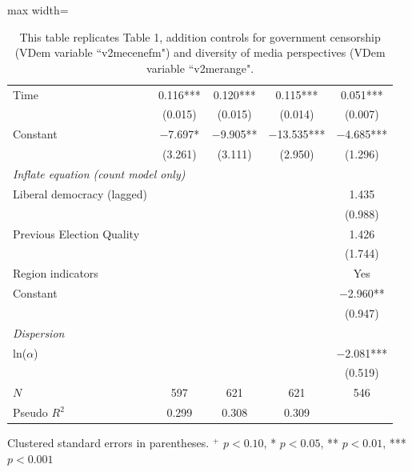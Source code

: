 \documentclass[USletter,12pt, titlepage]{article} %
\begin{document}
\begin{table}[H]
\begin{adjustbox}{max width=\textwidth}
\begin{threeparttable}
\begin{tabular}{lcccc}
Time & 0.116*** & 0.120*** & 0.115*** & 0.051*** \\
 & (0.015) & (0.015) & (0.014) & (0.007) \\
Constant & $-$7.697* & $-$9.905** & $-$13.535*** & $-$4.685*** \\
 & (3.261) & (3.111) & (2.950) & (1.296) \\
\midrule
\multicolumn{5}{l}{\textit{Inflate equation (count model only)}} \\
\midrule
Liberal democracy (lagged) & & & & 1.435 \\
 & & & & (0.988) \\
Previous Election Quality & & & & 1.426 \\
 & & & & (1.744) \\
Region indicators & & & & Yes \\
Constant & & & & $-$2.960** \\
 & & & & (0.947) \\
\midrule
\multicolumn{5}{l}{\textit{Dispersion}} \\
\midrule
ln($\alpha$) & & & & $-$2.081*** \\
 & & & & (0.519) \\
\midrule
$N$ & 597 & 621 & 621 & 546 \\
Pseudo $R^{2}$ & 0.299 & 0.308 & 0.309 & \\
\bottomrule
\end{tabular}
\begin{tablenotes}
\small
\item Clustered standard errors in parentheses. $^{+}$ $p<0.10$, * $p<0.05$, ** $p<0.01$, *** $p<0.001$
\end{tablenotes}
\end{threeparttable}
\end{adjustbox}
\vspace{0.5em}
\caption{This table replicates Table 1, addition controls for government censorship (VDem variable ``v2mecenefm") and diversity of media perspectives (VDem variable ``v2merange".}
\end{table}
\end{document}
